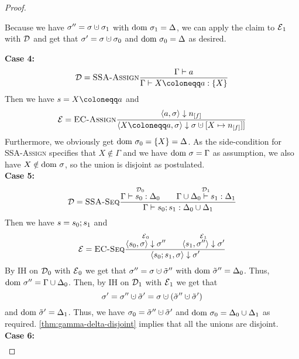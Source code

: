 \begin{proof}
\begin{landscape}
        Because we have $\store'' = \sigma \dunion \sigma_1$ with $\text{dom }{\sigma_1} = \Delta$, 
        we can apply the claim to $\operatorname{\mathcal{E}}_1$ with $\operatorname{\mathcal{D}}$ and get that $\sigma' = \sigma \dunion \sigma_0$
        and $\text{dom }{\sigma_0} = \Delta$ as desired.
    \end{landscape}
    \textbf{Case 4:}
    \begin{align*}
        \D = \rule{SSA-Assign}{\typestmt{\Gamma}{a}}{\typestep{\Gamma}{\defaultstore}{\{X\}}}
    \end{align*}
    Then we have $s = \defaultstore$ and
    \begin{align*}
        \E = \bsrule{EC-Assign}{\bigstep{a}{\store}{\flagged{}}}
        {\bigstep{\defaultstore}{\store}{\storeassign{\store}{X \mapsto \flagged{}]}}}
    \end{align*}
    Furthermore, we obviously get $\text{dom }{\sigma_0} = \{X\} = \Delta$.
    As the side-condition for \textsc{SSA-Assign} specifies that $X \notin \Gamma$
    and we have $\text{dom }{\sigma} = \Gamma$ as assumption, we also have $X \notin \text{dom }{\sigma}$,
    so the union is disjoint as postulated.\\
    \textbf{Case 5:}
    \begin{align*}
        \operatorname{\mathcal{D}} = \textsc{SSA-Seq}\frac{\displaystyle \overset{\operatorname{\mathcal{D}}_0}{\Gamma \vdash {s_0}: \Delta_0}\qquad
        \overset{\operatorname{\mathcal{D}}_1}{\Gamma \cup \Delta_0 \vdash {s_1}: \Delta_1}}{\displaystyle \Gamma \vdash {{s_0}; {s_1}}: \Delta_0 \cup \Delta_1}
    \end{align*}
    Then we have $s = {s_0}; {s_1}$ and
    \begin{align*}
        \operatorname{\mathcal{E}} =\textsc{EC-Seq}\frac{\displaystyle \overset{\operatorname{\mathcal{E}}_0}{\langle s_0, \sigma \rangle \downarrow \sigma''} \qquad 
        \overset{\operatorname{\mathcal{E}}_1}{\langle s_1, \sigma'' \rangle \downarrow \sigma'}}{\displaystyle \langle {s_0}; {s_1}, \sigma \rangle \downarrow \sigma'}
    \end{align*}
    By IH on $\operatorname{\mathcal{D}}_0$ with $\operatorname{\mathcal{E}}_0$ we get that $\sigma'' = \sigma \dunion \tilde{\store}''$ 
    with $\text{dom }{\tilde{\sigma}''} = \Delta_0$.
    Thus, $\text{dom }{\sigma''} = \Gamma \cup \Delta_0$.
    Then, by IH on $\operatorname{\mathcal{D}}_1$ with $\operatorname{\mathcal{E}}_1$ we get that
    $$\sigma' = \sigma'' \dunion \tilde{\store}' = \sigma \dunion (\tilde{\store}'' \dunion \tilde{\store}')$$
    and $\text{dom }{\tilde{\sigma}'} = \Delta_1$.
    Thus, we have $\sigma_0 = \tilde{\store}'' \dunion \tilde{\store}'$
    and $\text{dom }{\sigma_0} = \Delta_0 \cup \Delta_1$ as required.
    \autoref{thm:gamma-delta-disjoint} implies that all the unions are disjoint.\\
    \textbf{Case 6:}
    \begin{align*}

\end{align*}
\end{proof}
